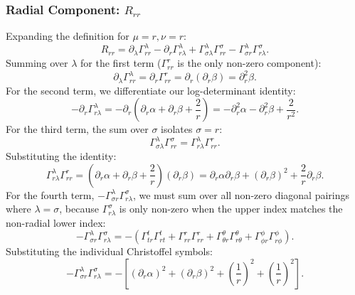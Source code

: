 \documentclass[11pt, a4paper]{report}
\begin{document}
\subsubsection{Radial Component: $R_{rr}$}
Expanding the definition for $\mu=r, \nu=r$:
\begin{equation}
R_{rr} = \partial_\lambda \Gamma^\lambda_{rr} - \partial_r \Gamma^\lambda_{r\lambda} + \Gamma^\lambda_{\sigma\lambda} \Gamma^\sigma_{rr} - \Gamma^\lambda_{\sigma r} \Gamma^\sigma_{r\lambda}.
\end{equation}
Summing over $\lambda$ for the first term ($\Gamma^r_{rr}$ is the only non-zero component):
\begin{equation}
\partial_\lambda \Gamma^\lambda_{rr} = \partial_r \Gamma^r_{rr} = \partial_r (\partial_r\beta) = \partial_r^2\beta.
\end{equation}
For the second term, we differentiate our log-determinant identity:
\begin{equation}
-\partial_r \Gamma^\lambda_{r\lambda} = -\partial_r \left( \partial_r\alpha + \partial_r\beta + \frac{2}{r} \right) = -\partial_r^2\alpha - \partial_r^2\beta + \frac{2}{r^2}.
\end{equation}
For the third term, the sum over $\sigma$ isolates $\sigma=r$:
\begin{equation}
\Gamma^\lambda_{\sigma\lambda} \Gamma^\sigma_{rr} = \Gamma^\lambda_{r\lambda} \Gamma^r_{rr}.
\end{equation}
Substituting the identity:
\begin{equation}
\Gamma^\lambda_{r\lambda} \Gamma^r_{rr} = \left( \partial_r\alpha + \partial_r\beta + \frac{2}{r} \right) (\partial_r\beta) = \partial_r\alpha\partial_r\beta + (\partial_r\beta)^2 + \frac{2}{r}\partial_r\beta.
\end{equation}
For the fourth term, $-\Gamma^\lambda_{\sigma r} \Gamma^\sigma_{r\lambda}$, we must sum over all non-zero diagonal pairings where $\lambda = \sigma$, because $\Gamma^\sigma_{r\lambda}$ is only non-zero when the upper index matches the non-radial lower index:
\begin{equation}
-\Gamma^\lambda_{\sigma r} \Gamma^\sigma_{r\lambda} = -\left( \Gamma^t_{tr} \Gamma^t_{rt} + \Gamma^r_{rr} \Gamma^r_{rr} + \Gamma^\theta_{\theta r} \Gamma^\theta_{r\theta} + \Gamma^\phi_{\phi r} \Gamma^\phi_{r\phi} \right).
\end{equation}
Substituting the individual Christoffel symbols:
\begin{equation}
-\Gamma^\lambda_{\sigma r} \Gamma^\sigma_{r\lambda} = -\left[ (\partial_r\alpha)^2 + (\partial_r\beta)^2 + \left(\frac{1}{r}\right)^2 + \left(\frac{1}{r}\right)^2 \right].
\end{equation}
\end{document}

